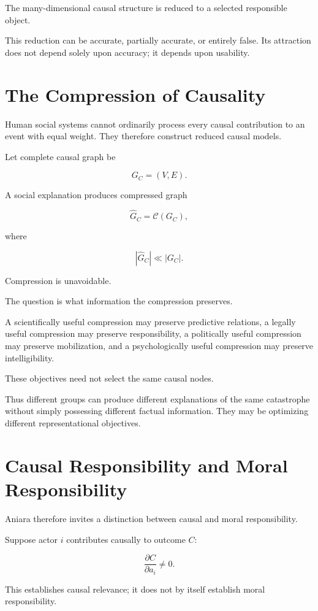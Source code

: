 \documentclass[11pt,oneside]{book}
\theoremstyle{definition}
\theoremstyle{remark}
\begin{document}
The many-dimensional causal structure is reduced to a selected responsible object.

This reduction can be accurate, partially accurate, or entirely false. Its attraction does not depend solely upon accuracy; it depends upon usability.

\section{The Compression of Causality}

Human social systems cannot ordinarily process every causal contribution to an event with equal weight. They therefore construct reduced causal models.

Let complete causal graph be

\[
G_C=(V,E).
\]

A social explanation produces compressed graph

\[
\widehat G_C
=
\mathcal C(G_C),
\]

where

\[
|\widehat G_C|\ll|G_C|.
\]

Compression is unavoidable.

The question is what information the compression preserves.

A scientifically useful compression may preserve predictive relations, a legally useful compression may preserve responsibility, a politically useful compression may preserve mobilization, and a psychologically useful compression may preserve intelligibility.

These objectives need not select the same causal nodes.

Thus different groups can produce different explanations of the same catastrophe without simply possessing different factual information. They may be optimizing different representational objectives.

\section{Causal Responsibility and Moral Responsibility}

Aniara therefore invites a distinction between causal and moral responsibility.

Suppose actor \(i\) contributes causally to outcome \(C\):

\[
\frac{\partial C}{\partial a_i}\neq0.
\]

This establishes causal relevance; it does not by itself establish moral responsibility.
\end{document}
